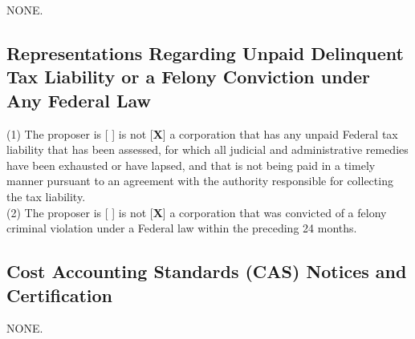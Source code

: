 NONE.

\subsection{Representations Regarding Unpaid Delinquent Tax Liability or a Felony Conviction under Any Federal Law}

\noindent (1) The proposer is [ ] is not [\textbf{X}] a corporation that has any unpaid Federal tax liability that has been assessed, for which all judicial and administrative remedies have been exhausted or have lapsed, and that is not being paid in a timely manner pursuant to an agreement with the authority responsible for collecting the tax liability. \\

\noindent (2) The proposer is [ ] is not [\textbf{X}] a corporation that was convicted of a felony criminal violation under a Federal law within the preceding 24 months.

\subsection{Cost Accounting Standards (CAS) Notices and Certification}

NONE.



